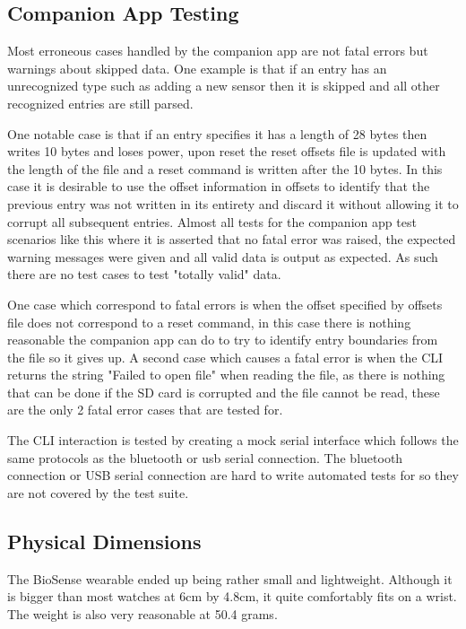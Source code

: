 \subsection{Companion App Testing}

Most erroneous cases handled by the companion app are not fatal errors but warnings about skipped data. One example is that if an entry has an unrecognized type such as adding a new sensor then it is skipped and all other recognized entries are still parsed.

One notable case is that if an entry specifies it has a length of 28 bytes then
writes 10 bytes and loses power, upon reset the reset offsets file is updated with 
the length of the file and a reset command is written after the 10 bytes.  
In this case it is desirable to use the offset information in offsets to 
identify that the previous entry was not written in its entirety and discard it without allowing it to corrupt all subsequent entries.  Almost all tests for the companion app test scenarios like this where it is asserted that no fatal error was raised, the expected warning messages were given and all valid data is output as expected. As such there are no test cases to test "totally valid" data.

One case which correspond to fatal errors is when the offset specified by offsets file does not correspond to a reset command, in this case there is nothing reasonable the companion app can do to try to identify entry boundaries from the file so it gives up.  A second case which causes a fatal error is when the CLI returns the string "Failed to open file" when reading the file, as there is nothing that can be done if the SD card is corrupted and the file cannot be read, these are the only 2 fatal error cases that are tested for.

The CLI interaction is tested by creating a mock serial interface which follows the same protocols as the bluetooth or usb serial connection.  The bluetooth connection or USB serial connection are hard to write automated tests for so they are not covered by the test suite.

\subsection{Physical Dimensions}

The BioSense wearable ended up being rather small and lightweight. Although it
is bigger than most watches at 6cm by 4.8cm, it quite comfortably fits on a
wrist. The weight is also very reasonable at 50.4 grams.

